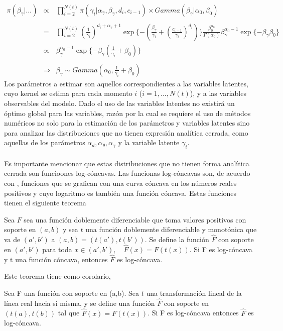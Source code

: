 \\
\begin{eqnarray*}
\pi(\beta_\gamma|...)&\propto&\prod_{i=2}^{N(t)} \pi(\gamma_i|\alpha_\gamma,\beta_\gamma,d_i,c_{i-1})\times Gamma(\beta_\gamma|\alpha_0,\beta_0)\\
\\
&=&\prod_{i=2}^{N(t)}(\frac{1}{\gamma_i})^{d_i+\alpha_\gamma+1}\exp{\{-(\frac{\beta_\gamma}{\gamma_i}+(\frac{c_{i-1}}{\gamma_i})^{d_i})\}}\frac{\beta_0^{\alpha_0}}{\Gamma(\alpha_0)} \beta_\gamma^{\alpha_0-1}\exp{\{-\beta_\gamma\beta_0\}}\\
&\propto&\beta_\gamma^{\alpha_0-1}\exp{\{-\beta_\gamma(\frac{1}{\gamma_i}+\beta_0)\}}\\
\\
&\Rightarrow& \beta_\gamma \sim Gamma(\alpha_0,\frac{1}{\gamma_i}+\beta_0)
\end{eqnarray*}
Los par\'ametros a estimar son aquellos correspondientes a las variables latentes, cuyo kernel se estima para cada momento $i$ ($i=1,...,N(t)$), y a las variables observables del modelo. Dado el uso de las variables latentes no existir\'a un \'optimo global para las variables, raz\'on por la cual se requiere el uso de m\'etodos num\'ericos no solo para la estimaci\'on de los par\'ametros y variables latentes sino para analizar las distribuciones que no tienen expresi\'on anal\'itica cerrada, como aquellas de los par\'ametros $\alpha_d,\alpha_\theta,\alpha_\gamma$ y la variable latente $\gamma_i$.\\
\\
Es importante mencionar que estas distribuciones que no tienen forma anal\'itica cerrada son funcioones log-c\'oncavas. Las funcionas log-c\'oncavas son, de acuerdo con \cite{bagnoli2005log}, funciones que se grafican con una curva c\'oncava en los n\'umeros reales positivos y cuyo logaritmo es tambi\'en una funci\'on c\'oncava. Estas funciones tienen el siguiente teorema\\
\begin{teo}
Sea $F$ sea una funci\'on doblemente diferenciable que toma valores positivos con soporte en $(a,b)$ y sea $t$ una funci\'on doblemente diferenciable y monot\'onica que va de $(a',b')$ a $(a,b)=(t(a'),t(b'))$. Se define la funci\'on $\hat{F}$ con soporte en $(a',b')$ para toda $x \in (a',b'), \quad \hat{F}(x)=F(t(x))$. Si F es log-c\'oncava y t una funci\'on c\'oncava, entonces $\hat{F}$ es log-c\'oncava.
\end{teo}
Este teorema tiene como corolario,
\begin{cor}
Sea F una funci\'on con soporte en (a,b). Sea $t$ una transformaci\'on lineal de la l\'inea real hacia si misma, y se define una funci\'on $\hat{F}$ con soporte en $(t(a),t(b))$ tal que $\hat{F}(x)=F(t(x))$. Si F es log-c\'oncava entonces $\hat{F}$ es log-c\'oncava. 
\end{cor}
